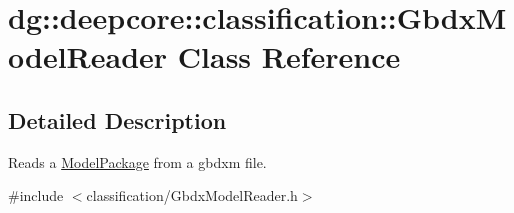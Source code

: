 \hypertarget{classdg_1_1deepcore_1_1classification_1_1_gbdx_model_reader}{}\section{dg\+:\+:deepcore\+:\+:classification\+:\+:Gbdx\+Model\+Reader Class Reference}
\label{classdg_1_1deepcore_1_1classification_1_1_gbdx_model_reader}


\subsection{Detailed Description}
Reads a \hyperlink{classdg_1_1deepcore_1_1classification_1_1_model_package}{Model\+Package} from a gbdxm file. 

{\ttfamily \#include $<$classification/\+Gbdx\+Model\+Reader.\+h$>$}


